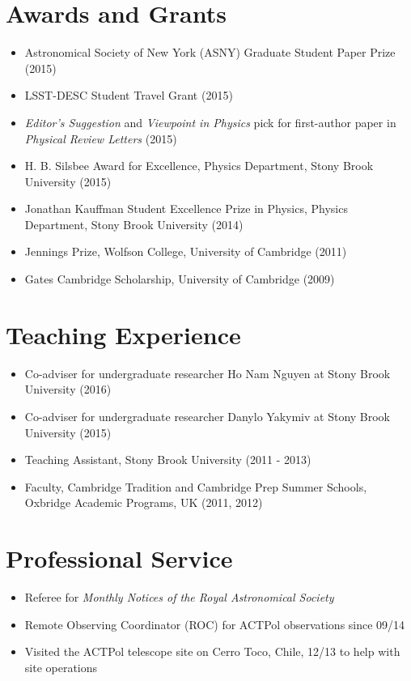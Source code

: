 \documentclass[10pt,margin]{res}
\begin{document}
\begin{resume}
\section{Awards and Grants}
\par
\begin{itemize}
\item Astronomical Society of New York (ASNY) Graduate Student Paper Prize (2015)
\item LSST-DESC Student Travel Grant (2015)
\item {\sl Editor's Suggestion} and {\sl Viewpoint in Physics} pick for first-author paper in {\sl Physical Review Letters} (2015)
\item H. B. Silsbee Award for Excellence, Physics Department, Stony Brook University (2015)
\item Jonathan Kauffman Student Excellence Prize in Physics, Physics Department, Stony Brook University (2014)
\item Jennings Prize, Wolfson College, University of Cambridge (2011)
\item Gates Cambridge Scholarship, University of Cambridge (2009) %
\end{itemize}

\section{Teaching Experience}
\begin{itemize}
\item Co-adviser for undergraduate researcher Ho Nam Nguyen at Stony Brook University (2016)
\item Co-adviser for undergraduate researcher Danylo Yakymiv at Stony Brook University (2015)
\item Teaching Assistant, Stony Brook University (2011 - 2013)
\item Faculty, Cambridge Tradition and Cambridge Prep Summer Schools, Oxbridge Academic Programs, UK (2011, 2012)
\end{itemize}

\section{Professional Service}
\begin{itemize}
\item Referee for {\sl Monthly Notices of the Royal Astronomical Society}
\item Remote Observing Coordinator (ROC) for ACTPol observations since 09/14
\item Visited the ACTPol telescope site on Cerro Toco, Chile, 12/13 to help with site operations
\end{itemize}


\end{resume}
\end{document}
